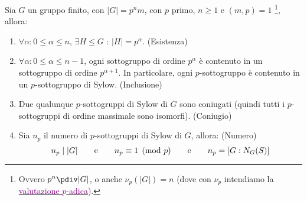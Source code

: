 \documentclass[11pt]{scrartcl}
\begin{document}
\begin{theorem}
    \label{Sylow}
    Sia $G$ un gruppo finito, con $|G| = p^nm$, con $p$ primo, $n \geq 1$ e $(m,p) = 1$ \footnote{Ovvero $p^n \pdiv |G|$, o anche $\nu_p(|G|) = n$ (dove con $\nu_p$ intendiamo la
     \href{https://it.wikipedia.org/wiki/Valutazione_p-adica}{\textcolor{purple}{valutazione $p$-adica}}).}, allora:
        \begin{enumerate}[(1)]
            \item $\forall \alpha : 0 \leq \alpha \leq n$, $\exists H \leqslant G$ : $|H| = p^\alpha$. {\color{orange}(Esistenza)}
            \item $\forall \alpha : 0 \leq \alpha \leq n-1$, ogni sottogruppo di ordine $p^\alpha$ è contenuto in un sottogruppo di ordine $p^{\alpha+1}$. In particolare,
                ogni $p$-sottogruppo è contenuto in un $p$-sottogruppo di Sylow. {\color{orange}(Inclusione)}
            \item Due qualunque $p$-sottogruppi di Sylow di $G$ sono coniugati (quindi tutti i $p$-sottogruppi di ordine massimale sono isomorfi). {\color{orange}(Coniugio)}
            \item Sia $n_p$ il numero di $p$-sottogruppi di Sylow di $G$, allora: {\color{orange}(Numero)}
                \[ n_p \mid |G| \qquad \text{e} \qquad n_p \equiv 1 \pmod p \qquad \text e \qquad n_p = [G : N_G(S)]
                    \]
        \end{enumerate}
\end{theorem}
\end{document}
